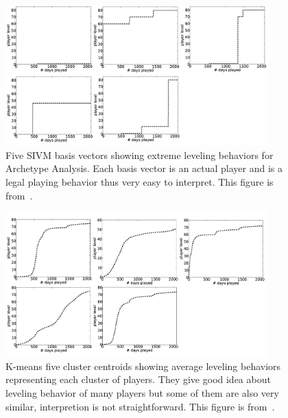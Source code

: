 \begin{figure}[here]
\centerline{\includegraphics[width=0.9\textwidth]{Figures/sivmbasis.png}}
\caption{Five SIVM basis vectors showing extreme leveling behaviors for Archetype Analysis. Each basis vector is an actual player and is a legal playing behavior thus very easy to interpret. This figure is from~\citep{Drachen:2013}.}
\label{fig:sivmbasis}
\end{figure}


\begin{figure}[here]
\centerline{\includegraphics[width=0.9\textwidth]{Figures/kmeansbasis.png}}
\caption{K-means five cluster centroids showing average leveling behaviors representing each cluster of players. They give good idea about leveling behavior of many players but some of them are also very similar, interpretion is not straightforward. This figure is from~\citep{Drachen:2013}. }
\label{fig:kmeansbasis}
\end{figure}


